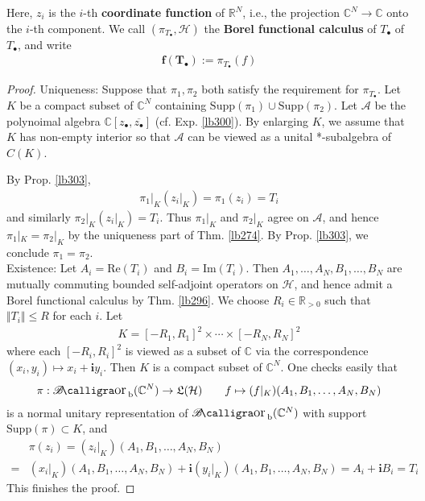 \documentclass[12pt,b5paper,notitlepage]{article}
\theoremstyle{definition}
\theoremstyle{plain}
\DeclareMathOperator{\Borb}{{\mathscr{B}\text{\kern -2pt {\calligra\large or}}\,}_{\mathrm b}}
\newcommand{\fk}{\mathfrak}
\newcommand{\ovl}{\overline}
\newcommand{\scr}{\mathscr}
\newcommand{\im}{\mathbf{i}}
\newcommand{\blt}{\bullet}
\newcommand{\Cbb}{\mathbb C}
\newcommand{\Rbb}{\mathbb R}
\newcommand{\Real}{\mathrm{Re}}
\newcommand{\Imag}{\mathrm{Im}}
\newcommand{\Supp}{\mathrm{Supp}}
\newcommand{\MH}{\mathcal H}
\numberwithin{equation}{section}
\begin{document}
Here, $z_i$ is the $i$-th \textbf{coordinate function} of $\Rbb^N$, i.e., the projection $\Cbb^N\rightarrow\Cbb$ onto the $i$-th component. We call $(\pi_{T_\blt},\MH)$ the \textbf{Borel functional calculus} of $T_\blt$  of $T_\blt$, and write
\begin{align*}
\pmb{f(T_\blt)}:=\pi_{T_\blt}(f)
\end{align*}



\begin{proof}
Uniqueness: Suppose that $\pi_1,\pi_2$ both satisfy the requirement for $\pi_{T_\blt}$. Let $K$ be a compact subset of $\Cbb^N$ containing $\Supp(\pi_1)\cup\Supp(\pi_2)$. Let $\scr A$ be the polynoimal algebra $\Cbb[z_\blt,\ovl{z_\blt}]$ (cf. Exp. \ref{lb300}). By enlarging $K$, we assume that $K$ has non-empty interior so that $\scr A$ can be viewed as a unital *-subalgebra of $C(K)$. 

By Prop. \ref{lb303},
\begin{align*}
\pi_1|_K(z_i|_K)=\pi_1(z_i)=T_i
\end{align*}
and similarly $\pi_2|_K(z_i|_K)=T_i$. Thus $\pi_1|_K$ and $\pi_2|_K$ agree on $\scr A$, and hence $\pi_1|_K=\pi_2|_K$ by the uniqueness part of Thm. \ref{lb274}. By Prop. \ref{lb303}, we conclude $\pi_1=\pi_2$.\\[-1ex]

Existence: Let $A_i=\Real(T_i)$ and $B_i=\Imag(T_i)$. Then $A_1,\dots,A_N,B_1,\dots,B_N$ are mutually commuting bounded self-adjoint operators on $\MH$, and hence admit a Borel functional calculus by Thm. \ref{lb296}. We choose $R_i\in\Rbb_{>0}$ such that $\Vert T_i\Vert\leq R$ for each $i$. Let 
\begin{align*}
K=[-R_1,R_1]^2\times\cdots\times[-R_N,R_N]^2
\end{align*}
where each $[-R_i,R_i]^2$ is viewed as a subset of $\Cbb$ via the correspondence $(x_i,y_i)\mapsto x_i+\im y_i$. Then $K$ is a compact subset of $\Cbb^N$. One checks easily that
\begin{align*}
\pi:\Borb(\Cbb^N)\rightarrow\fk L(\MH)\qquad f\mapsto (f|_K)(A_1,B_1,\dots,A_N,B_N)
\end{align*}
is a normal unitary representation of $\Borb(\Cbb^N)$ with support $\Supp(\pi)\subset K$, and
\begin{align*}
&\pi(z_i)=(z_i|_K)(A_1,B_1,\dots,A_N,B_N)\\
=&(x_i|_K)(A_1,B_1,\dots,A_N,B_N)+\im (y_i|_K)(A_1,B_1,\dots,A_N,B_N)=A_i+\im B_i=T_i
\end{align*}
This finishes the proof.
\end{proof}
\end{document}
